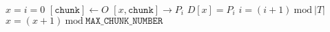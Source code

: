 \documentclass{article}
\begin{document}
\pagestyle{empty}

\newcommand{\send}{\Rightarrow}
\newcommand{\sendto}{\rightarrow}
\newcommand{\recv}{\Leftarrow}
\algrenewcommand{}

\begin{algorithmic}

  \State $x=i=0$
  \State $[\mathtt{chunk}] \gets O$
  \State $[x,\mathtt{chunk}] \sendto P_i$
  \State $D[x]=P_i$
  \State $i=(i+1)~\text{mod}~|T|$
  \State $x=(x+1)~\text{mod}~\mathtt{MAX\_CHUNK\_NUMBER}$
  \EndWhile
  \EndProcedure
  
\end{algorithmic}
\end{document}
